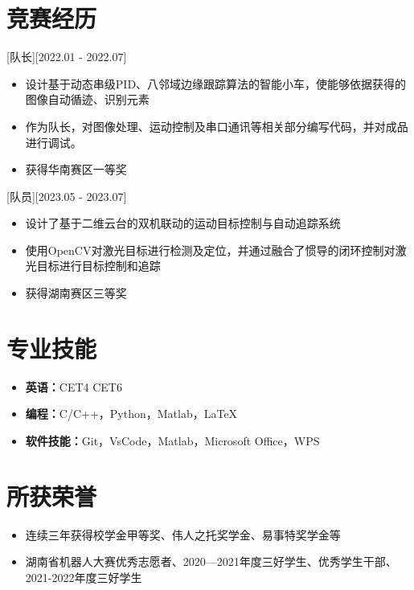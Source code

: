 \documentclass{resume}
\begin{document}
\section{竞赛经历}

[队长][2022.01 - 2022.07] 
\begin{itemize}
  \item 设计基于动态串级PID、八邻域边缘跟踪算法的智能小车，使能够依据获得的图像自动循迹、识别元素
  \item 作为队长，对图像处理、运动控制及串口通讯等相关部分编写代码，并对成品进行调试。
  \item 获得华南赛区一等奖
\end{itemize}

[队员][2023.05 - 2023.07] 

\begin{itemize}
  \item 设计了基于二维云台的双机联动的运动目标控制与自动追踪系统
  \item 使用OpenCV对激光目标进行检测及定位，并通过融合了惯导的闭环控制对激光目标进行目标控制和追踪
  \item 获得湖南赛区三等奖
\end{itemize}


\section{专业技能}
\begin{itemize}
    \item \textbf{英语：}CET4 CET6
    \item \textbf{编程：}C/C++，Python，Matlab，LaTeX
    \item \textbf{软件技能：}Git，VsCode，Matlab，Microsoft Office，WPS
\end{itemize}

\section{所获荣誉}
\begin{itemize}
  \item 连续三年获得校学金甲等奖、伟人之托奖学金、易事特奖学金等
  \item 湖南省机器人大赛优秀志愿者、2020—2021年度三好学生、优秀学生干部、2021-2022年度三好学生
\end{itemize}
\end{document}
